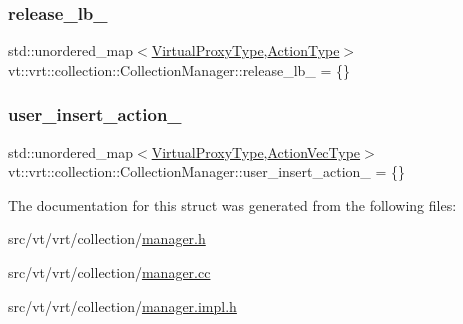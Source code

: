 \subsubsection{\texorpdfstring{release\+\_\+lb\+\_\+}{release\_lb\_}}
{\footnotesize\ttfamily std\+::unordered\+\_\+map$<$\hyperlink{namespacevt_a1b417dd5d684f045bb58a0ede70045ac}{Virtual\+Proxy\+Type},\hyperlink{namespacevt_ae0a5a7b18cc99d7b732cb4d44f46b0f3}{Action\+Type}$>$ vt\+::vrt\+::collection\+::\+Collection\+Manager\+::release\+\_\+lb\+\_\+ = \{\}\hspace{0.3cm}{\ttfamily [private]}}

\mbox{\label{structvt_1_1vrt_1_1collection_1_1_collection_manager_a8d436079bfbadeacdf0584b01c150c29}} 
\subsubsection{\texorpdfstring{user\+\_\+insert\+\_\+action\+\_\+}{user\_insert\_action\_}}
{\footnotesize\ttfamily std\+::unordered\+\_\+map$<$\hyperlink{namespacevt_a1b417dd5d684f045bb58a0ede70045ac}{Virtual\+Proxy\+Type},\hyperlink{structvt_1_1vrt_1_1collection_1_1_collection_manager_a51650235f0e53ae08381942eba822679}{Action\+Vec\+Type}$>$ vt\+::vrt\+::collection\+::\+Collection\+Manager\+::user\+\_\+insert\+\_\+action\+\_\+ = \{\}\hspace{0.3cm}{\ttfamily [private]}}



The documentation for this struct was generated from the following files\+:\begin{DoxyCompactItemize}
\item 
src/vt/vrt/collection/\hyperlink{vrt_2collection_2manager_8h}{manager.\+h}\item 
src/vt/vrt/collection/\hyperlink{vrt_2collection_2manager_8cc}{manager.\+cc}\item 
src/vt/vrt/collection/\hyperlink{vrt_2collection_2manager_8impl_8h}{manager.\+impl.\+h}\end{DoxyCompactItemize}
